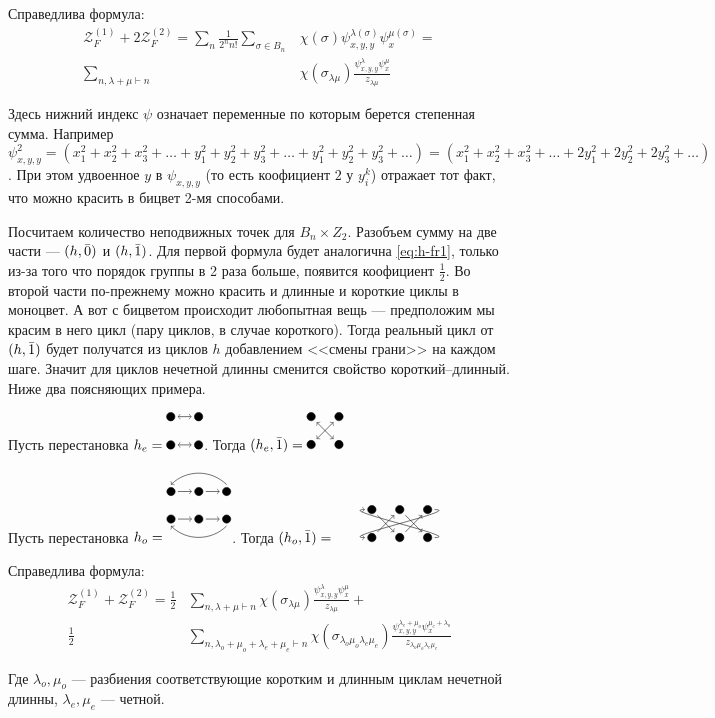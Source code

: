 \begin{statement}
Справедлива формула:
\begin{equation}
\label{eq:h-fr1}
\begin{split}
\mathcal Z_F^{(1)} + 2\mathcal Z_F^{(2)} = 
\sum_{n}\frac{1}{2^{n}n!}\sum_{\sigma \in B_n}&\chi(\sigma)
\psi_{x, y, y}^{\lambda(\sigma)} \psi_{x}^{\mu(\sigma)} = \\
\sum_{n, \lambda + \mu \vdash n}&\chi(\sigma_{\lambda \mu})
\frac{\psi_{x, y, y}^{\lambda} \psi_{x}^{\mu}}{z_{\lambda \mu}}
\end{split}
\end{equation}
\end{statement}
Здесь нижний индекс $\psi$ означает переменные по которым берется степенная
сумма. Например $\psi_{x, y, y}^2 =  (x_1^2 + x_2^2 + x_3^2 + \dots + y_1^2 +
y_2^2 + y_3^2 + \dots + y_1^2 + y_2^2 + y_3^2 + \dots) = (x_1^2 + x_2^2 + x_3^2
+ \dots + 2y_1^2 + 2y_2^2 + 2y_3^2 + \dots)$. При этом удвоенное $y$ в
$\psi_{x,y,y}$ (то есть коофициент $2$ у $y_i^k$) отражает тот факт, что можно
красить в бицвет 2-мя способами.

Посчитаем количество неподвижных точек для $B_n \times Z_2$. Разобъем
сумму на две части --- $(h, \Bar 0)$ и $(h, \Bar 1)$. Для первой формула будет
аналогична \ref{eq:h-fr1}, только из-за того что порядок группы в 2 раза больше,
появится коофициент $\frac{1}{2}$. 
Во второй части по-прежнему можно красить и длинные и короткие циклы в моноцвет.
А вот с бицветом происходит любопытная вещь --- предположим мы красим в него
цикл (пару циклов, в случае короткого). Тогда реальный цикл от $(h, \Bar 1)$
будет получатся из циклов $h$ добавлением <<смены грани>> на каждом шаге. 
Значит для циклов нечетной длинны сменится свойство короткий--длинный. Ниже
два поясняющих примера.
\begin{example}
Пусть перестановка $h_e = \dheA$.
Тогда $(h_e, \Bar 1) = \dheB$
\end{example}
\begin{example}
Пусть перестановка $h_o = \dhoA$.
Тогда $(h_o, \Bar 1) = \dhoB$
\end{example}

\begin{statement}
Справедлива формула:
\begin{equation}
\label{eq:h-fr2}
\begin{split}
\mathcal Z_F^{(1)} + \mathcal Z_F^{(2)} = 
\frac{1}{2}&
\sum_{n, \lambda + \mu \vdash n}\chi(\sigma_{\lambda \mu})
\frac{\psi_{x, y, y}^{\lambda} \psi_{x}^{\mu}}{z_{\lambda \mu}}
+ \\
\frac{1}{2}&
\sum_{n, \lambda_o + \mu_o + \lambda_e + \mu_e \vdash
n}\chi(\sigma_{\lambda_o \mu_o \lambda_e \mu_e})
\frac{\psi_{x, y, y}^{\lambda_e + \mu_o} \psi_{x}^{\mu_e + 
\lambda_o}}{z_{\lambda_o \mu_o \lambda_e \mu_e}}
\end{split}
\end{equation}
\end{statement}
Где $\lambda_o, \mu_o$ --- разбиения соответствующие коротким и длинным циклам
нечетной длинны, $\lambda_e, \mu_e$ --- четной.

